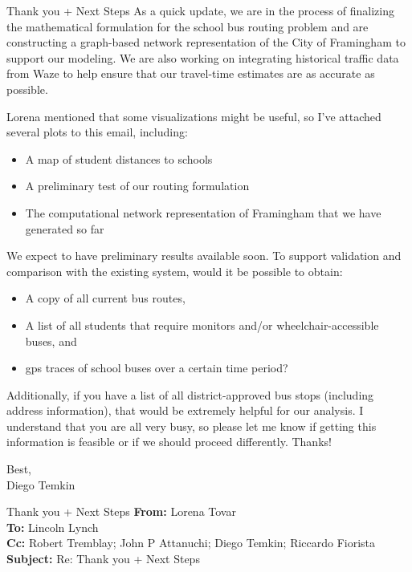 {\begin{emailbox}{Thank you + Next Steps}
    As a quick update, we are in the process of finalizing the mathematical formulation for the school bus routing problem and are constructing a graph-based network representation of the City of Framingham to support our modeling. We are also working on integrating historical traffic data from Waze to help ensure that our travel-time estimates are as accurate as possible. \vspace{1em}

    Lorena mentioned that some visualizations might be useful, so I've attached several plots to this email, including:
    \begin{itemize}
        \item A map of student distances to schools
        \item A preliminary test of our routing formulation
        \item The computational network representation of Framingham that we have generated so far
    \end{itemize}

    We expect to have preliminary results available soon. To support validation and comparison with the existing system, would it be possible to obtain:
    \begin{itemize}
        \item A copy of all current bus routes,
        \item A list of all students that require monitors and/or wheelchair-accessible buses, and
        \item \acrshort{gps} traces of school buses over a certain time period?
    \end{itemize}

    Additionally, if you have a list of all district-approved bus stops (including address information), that would be extremely helpful for our analysis. I understand that you are all very busy, so please let me know if getting this information is feasible or if we should proceed differently. Thanks! \vspace{1em}

    Best, \\
    Diego Temkin
\end{emailbox}

\begin{emailbox}{Thank you + Next Steps}
    \textbf{From:} Lorena Tovar \\
    \textbf{To:} Lincoln Lynch \\
    \textbf{Cc:} Robert Tremblay; John P Attanuchi; Diego Temkin; Riccardo Fiorista \\
    \textbf{Subject:} Re: Thank you + Next Steps


\end{emailbox}}
